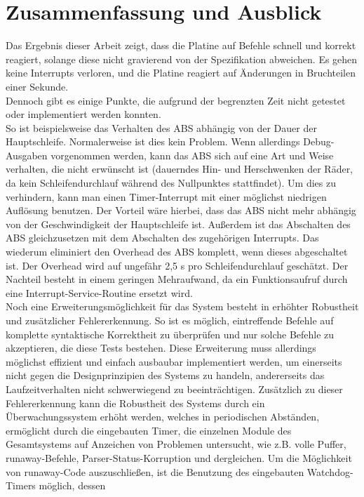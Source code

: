 \chapter{Zusammenfassung und Ausblick}
Das Ergebnis dieser Arbeit zeigt, dass die Platine auf Befehle schnell und korrekt reagiert,
solange diese nicht gravierend von der Spezifikation abweichen. Es gehen keine Interrupts verloren, und die
Platine reagiert auf Änderungen in Bruchteilen einer Sekunde.\\
Dennoch gibt es einige Punkte, die aufgrund der begrenzten Zeit nicht getestet oder implementiert
werden konnten.\\
So ist beispielsweise das Verhalten des ABS abhängig von der Dauer der Hauptschleife. Normalerweise
ist dies kein Problem. Wenn allerdings Debug-Ausgaben vorgenommen werden, kann das ABS sich
auf eine Art und Weise verhalten, die nicht erwünscht ist (dauerndes Hin- und Herschwenken der Räder,
da kein Schleifendurchlauf während des Nullpunktes stattfindet). Um dies zu verhindern, kann man
einen Timer-Interrupt mit einer möglichst niedrigen Auflösung benutzen. Der Vorteil wäre hierbei,
dass das ABS nicht mehr abhängig von der Geschwindigkeit der Hauptschleife ist. Außerdem ist das
Abschalten des ABS gleichzusetzen mit dem Abschalten des zugehörigen Interrupts. Das wiederum
eliminiert den Overhead des ABS komplett, wenn dieses abgeschaltet ist. Der Overhead wird auf
ungefähr 2,5 \textmu{}s pro Schleifendurchlauf geschätzt. Der Nachteil besteht in einem geringen
Mehraufwand, da ein Funktionsaufruf durch eine Interrupt-Service-Routine ersetzt wird.\\
Noch eine Erweiterungsmöglichkeit für das System besteht in erhöhter Robustheit und zusätzlicher 
Fehlererkennung. So ist es möglich, eintreffende Befehle auf komplette syntaktische Korrektheit
zu überprüfen und nur solche Befehle zu akzeptieren, die diese Tests bestehen. Diese Erweiterung
muss allerdings möglichst effizient und einfach ausbaubar implementiert werden, um einerseits nicht
gegen die Designprinzipien des Systems zu handeln, andererseits das Laufzeitverhalten nicht
schwerwiegend zu beeinträchtigen. Zusätzlich zu dieser Fehlererkennung kann die Robustheit des Systems
durch ein Überwachungssystem erhöht werden, welches in periodischen Abständen, ermöglicht durch
die eingebauten Timer, die einzelnen Module des Gesamtsystems auf Anzeichen von Problemen untersucht,
wie z.B. volle Puffer, runaway-Befehle, Parser-Status-Korruption und dergleichen. Um die Möglichkeit
von runaway-Code auszuschließen, ist die Benutzung des eingebauten Watchdog-Timers möglich, dessen
